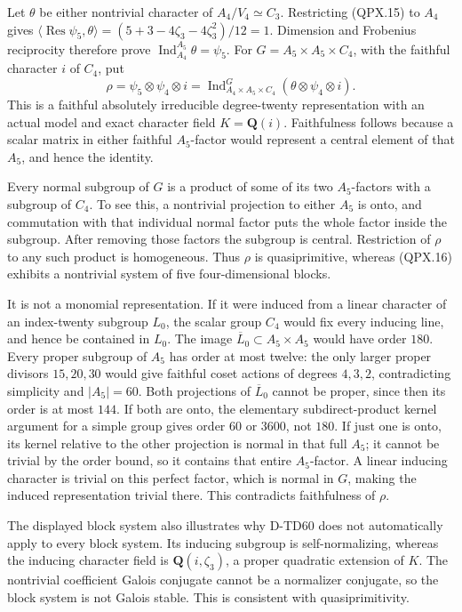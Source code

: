 Let \(\theta\) be either nontrivial character of
\(A_4/V_4\simeq C_3\). Restricting (QPX.15) to
\(A_4\) gives
\(\langle\operatorname{Res}\psi_5,\theta\rangle
=(5+3-4\zeta_3-4\zeta_3^2)/12=1\).
Dimension and Frobenius reciprocity therefore prove
\(\operatorname{Ind}_{A_4}^{A_5}\theta=\psi_5\).
For \(G=A_5\times A_5\times C_4\), with the faithful
character \(i\) of \(C_4\), put
\[
 \rho=\psi_5\otimes\psi_4\otimes i
 =\operatorname{Ind}_{A_4\times A_5\times C_4}^{G}
                    (\theta\otimes\psi_4\otimes i).
 \tag{QPX.16}
\]
This is a faithful absolutely irreducible degree-twenty
representation with an actual model and exact character
field \(K=\mathbf Q(i)\). Faithfulness follows because
a scalar matrix in either faithful \(A_5\)-factor
would represent a central element of that \(A_5\),
and hence the identity.

Every normal subgroup of \(G\) is a product of some
of its two \(A_5\)-factors with a subgroup of \(C_4\).
To see this, a nontrivial projection to either \(A_5\)
is onto, and commutation with that individual normal
factor puts the whole factor inside the subgroup.
After removing those factors the subgroup is central.
Restriction of \(\rho\) to any such product is
homogeneous. Thus \(\rho\) is quasiprimitive, whereas
(QPX.16) exhibits a nontrivial system of five
four-dimensional blocks.

It is not a monomial representation. If it were
induced from a linear character of an index-twenty
subgroup \(L_0\), the scalar group \(C_4\) would fix
every inducing line, and hence be contained in \(L_0\).
The image \(\overline L_0\subset A_5\times A_5\)
would have order \(180\).
Every proper subgroup of \(A_5\) has order at most
twelve: the only larger proper divisors \(15,20,30\)
would give faithful coset actions of degrees \(4,3,2\),
contradicting simplicity and \(|A_5|=60\).
Both projections of \(\overline L_0\) cannot be proper,
since then its order is at most \(144\).
If both are onto, the elementary subdirect-product
kernel argument for a simple group gives order
\(60\) or \(3600\), not \(180\).
If just one is onto, its kernel relative to the
other projection is normal in that full \(A_5\);
it cannot be trivial by the order bound, so it
contains that entire \(A_5\)-factor.
A linear inducing character is trivial on this
perfect factor, which is normal in \(G\), making
the induced representation trivial there. This
contradicts faithfulness of \(\rho\).

The displayed block system also illustrates why
D-TD60 does not automatically apply to every block
system. Its inducing subgroup is self-normalizing,
whereas the inducing character field is
\(\mathbf Q(i,\zeta_3)\), a proper quadratic
extension of \(K\). The nontrivial coefficient
Galois conjugate cannot be a normalizer conjugate,
so the block system is not Galois stable.
This is consistent with quasiprimitivity.

